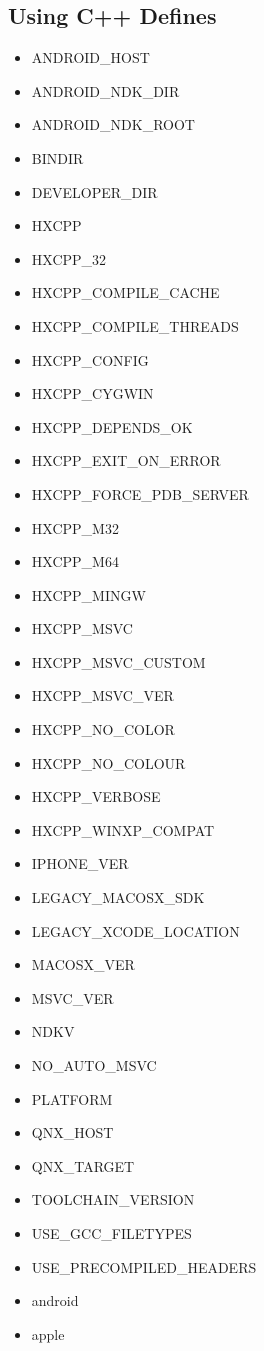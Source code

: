 \subsection{Using C++ Defines}
\label{target-cpp-defines}
\begin{itemize}
	\item ANDROID_HOST
	\item ANDROID_NDK_DIR
	\item ANDROID_NDK_ROOT
	\item BINDIR
	\item DEVELOPER_DIR
	\item HXCPP
	\item HXCPP_32
	\item HXCPP_COMPILE_CACHE
	\item HXCPP_COMPILE_THREADS
	\item HXCPP_CONFIG
	\item HXCPP_CYGWIN
	\item HXCPP_DEPENDS_OK
	\item HXCPP_EXIT_ON_ERROR
	\item HXCPP_FORCE_PDB_SERVER
	\item HXCPP_M32
	\item HXCPP_M64
	\item HXCPP_MINGW
	\item HXCPP_MSVC
	\item HXCPP_MSVC_CUSTOM
	\item HXCPP_MSVC_VER
	\item HXCPP_NO_COLOR
	\item HXCPP_NO_COLOUR
	\item HXCPP_VERBOSE
	\item HXCPP_WINXP_COMPAT
	\item IPHONE_VER
	\item LEGACY_MACOSX_SDK
	\item LEGACY_XCODE_LOCATION
	\item MACOSX_VER
	\item MSVC_VER
	\item NDKV
	\item NO_AUTO_MSVC
	\item PLATFORM
	\item QNX_HOST
	\item QNX_TARGET
	\item TOOLCHAIN_VERSION
	\item USE_GCC_FILETYPES
	\item USE_PRECOMPILED_HEADERS
	\item android
	\item apple

\end{itemize}

